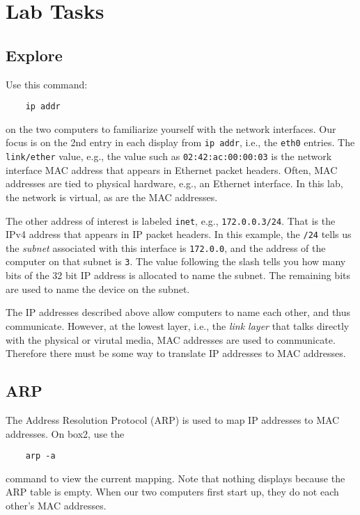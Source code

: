 \section{Lab Tasks}
\subsection{Explore}
Use this command:
\begin{verbatim}
    ip addr
\end{verbatim}
\noindent on the two computers to familiarize yourself with the network interfaces.
Our focus is on the 2nd entry in each display from {\tt ip addr}, i.e., the {\tt eth0} entries.
The {\tt link/ether} value, e.g., the value such as {\tt 02:42:ac:00:00:03} is the network interface
MAC address that appears in Ethernet packet headers.  Often, MAC addresses are tied
to physical hardware, e.g., an Ethernet interface. In this lab, the network is virtual, as are the MAC 
addresses.

The other address of interest is 
labeled {\tt inet}, e.g., {\tt 172.0.0.3/24}.  That is the IPv4 address that appears in IP packet headers.
In this example, the {\tt /24} tells us the \textit{subnet} associated with this interface is
{\tt 172.0.0}, and the address of the computer on that subnet is {\tt 3}.  The value following the
slash tells you how many bits of the 32 bit IP address is allocated to name the subnet.  The remaining bits
are used to name the device on the subnet.

The IP addresses described above allow computers to name each other, and thus communicate.  However, at the lowest
layer, i.e., the \textit{link layer} that talks directly with the physical or virutal media, MAC addresses
are used to communicate.  Therefore there must be some way to translate IP addresses to MAC addresses.

\subsection{ARP}
The Address Resolution Protocol (ARP) is used to map IP addresses to MAC addresses.
On box2, use the 
\begin{verbatim}
    arp -a 
\end{verbatim}
\noindent command to view the current mapping.   Note that nothing displays
because the ARP table is empty.
When our two computers first start up, they do not each other's MAC addresses.

